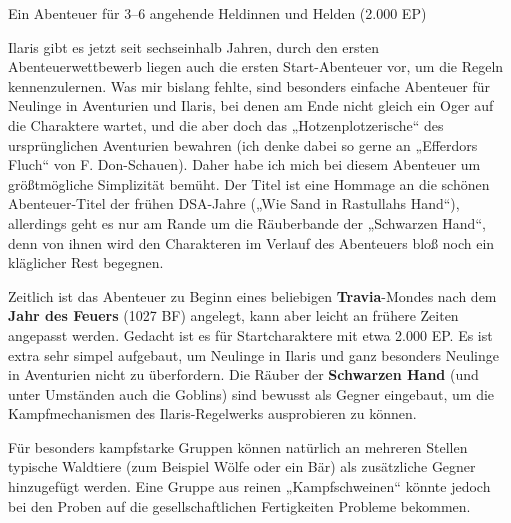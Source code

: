 \begin{center} 
    Ein Abenteuer für 3--6 angehende Heldinnen und Helden (2.000 EP)
\end{center}

\vfill

%



\vfill

\spaltenanfang

Ilaris gibt es jetzt seit sechseinhalb Jahren, durch den ersten Abenteuerwettbewerb
liegen auch die ersten Start-Abenteuer vor, um die Regeln kennenzulernen. Was mir 
bislang fehlte, sind besonders einfache Abenteuer für Neulinge in Aventurien und Ilaris, 
bei denen am Ende nicht gleich ein Oger auf die Charaktere wartet, und die aber doch das 
„Hotzenplotzerische“ des ursprünglichen Aventurien bewahren (ich denke dabei so gerne an
„Efferdors Fluch“ von F. Don-Schauen). Daher habe ich mich bei diesem Abenteuer um
größtmögliche Simplizität bemüht. Der Titel ist eine Hommage an die schönen Abenteuer-Titel 
der frühen DSA-Jahre („Wie Sand in Rastullahs Hand“), allerdings geht es nur am Rande um die 
Räuberbande der „Schwarzen Hand“, denn von ihnen wird den Charakteren im Verlauf des Abenteuers 
bloß noch ein kläglicher Rest begegnen.

\neueseite


Zeitlich ist das Abenteuer zu Beginn eines beliebigen \textbf{Travia}-Mondes nach dem \textbf{Jahr des Feuers} (1027 BF)
angelegt, kann aber leicht an frühere Zeiten angepasst werden. 
Gedacht ist es für Startcharaktere mit etwa 2.000 EP. 
Es ist extra sehr simpel aufgebaut, um Neulinge in Ilaris und ganz besonders Neulinge in Aventurien 
nicht zu überfordern. Die Räuber der \textbf{Schwarzen Hand} (und unter Umständen auch die Goblins) sind  bewusst als 
Gegner eingebaut, um die Kampfmechanismen des Ilaris-Regelwerks ausprobieren zu können. 

Für besonders kampfstarke Gruppen können natürlich an mehreren Stellen typische Waldtiere 
(zum Beispiel Wölfe oder ein Bär) als zusätzliche Gegner hinzugefügt werden. Eine Gruppe aus reinen 
„Kampfschweinen“ könnte jedoch bei den Proben auf die gesellschaftlichen Fertigkeiten Probleme bekommen.

